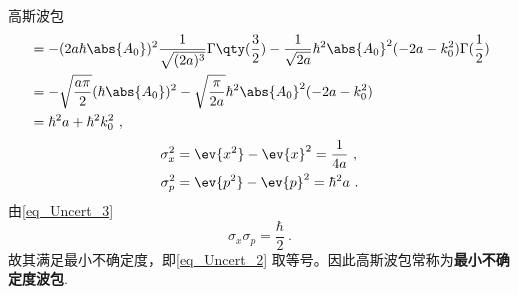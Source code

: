 \begin{example}{高斯波包}
\begin{equation}
\begin{aligned}
&=-(2a\hbar\abs{A_0})^2\frac{1}{\sqrt{(2a)^3}}\Gamma\qty(\frac{3}{2})-\frac{1}{\sqrt{2a}}\hbar^2 \abs{A_0}^2(-2a-k_0^2)\Gamma(\frac{1}{2})\\
&=-\sqrt{\frac{a\pi}{2}}(\hbar\abs{A_0})^2-\sqrt{\frac{\pi}{2a}}\hbar^2 \abs{A_0}^2(-2a-k_0^2)\\
&=\hbar^2a+\hbar^2k_0^2~,
\end{aligned}
\end{equation}
\begin{equation}\label{eq_Uncert_3}
\begin{aligned}
\sigma_x^2&=\ev{x^2}-\ev{x}^2=\frac{1}{4a}~, \\
\sigma_p^2&=\ev{p^2}-\ev{p}^2=\hbar^2a~.
\end{aligned}
\end{equation}
由\autoref{eq_Uncert_3} 
\begin{equation}
\sigma_x\sigma_p=\frac{\hbar}{2}~.
\end{equation}
故其满足最小不确定度，即\autoref{eq_Uncert_2} 取等号。因此高斯波包常称为\textbf{最小不确定度波包}.
\end{example}














